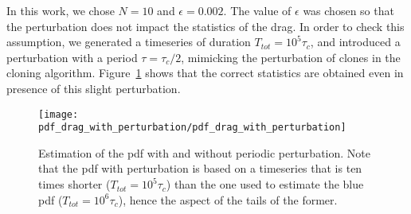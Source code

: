 In this work, we chose $N = 10$ and $\epsilon = 0.002$.
The value of $\epsilon$ was chosen so that the perturbation does not impact the statistics of the drag.
In order to check this assumption, we generated a timeseries of duration $T_{tot} = 10^5 \tau_c$, and introduced a perturbation with a period $\tau = \tau_c / 2$, mimicking the perturbation of clones in the cloning algorithm.
Figure~\ref{fig:pdf_drag_with_perturbation} shows that the correct statistics are obtained even in presence of this slight perturbation.

\begin{figure}
  \centering
  \texttt{[image: pdf\_drag\_with\_perturbation/pdf\_drag\_with\_perturbation]}
  \caption{Estimation of the \ac{pdf} with and without periodic perturbation.
    Note that the \ac{pdf} with perturbation is based on a timeseries that is ten times shorter ($T_{tot} = 10^5 \tau_c$) than the one used to estimate the blue \ac{pdf} ($T_{tot} = 10^6 \tau_c$), hence the aspect of the tails of the former.}
  \label{fig:pdf_drag_with_perturbation}
\end{figure}

